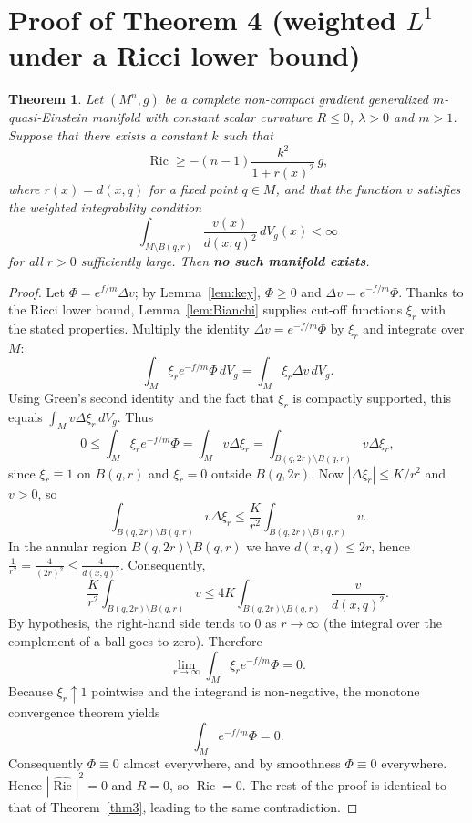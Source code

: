 \documentclass[12pt,a4paper]{article}
\newcommand{\Ric}{\operatorname{Ric}}
\newtheorem{theorem}{Theorem}[section]
\theoremstyle{definition}
\theoremstyle{definition}
\begin{document}
\section{Proof of Theorem 4 (weighted $L^1$ under a Ricci lower bound)}
\label{sec:thm4}

\begin{theorem}\label{thm4}
Let $(M^n,g)$ be a complete non-compact gradient generalized $m$-quasi-Einstein manifold with constant scalar curvature $R\le 0$, $\lambda>0$ and $m>1$.
Suppose that there exists a constant $k$ such that
\[
\Ric \ge -(n-1)\frac{k^2}{1+r(x)^2}\,g,
\]
where $r(x)=d(x,q)$ for a fixed point $q\in M$, and that the function $v$ satisfies the weighted integrability condition
\[
\int_{M\setminus B(q,r)} \frac{v(x)}{d(x,q)^2}\,dV_g(x) < \infty
\]
for all $r>0$ sufficiently large.
Then \textbf{no such manifold exists}.
\end{theorem}

\begin{proof}
Let $\Phi = e^{f/m}\Delta v$; by Lemma~\ref{lem:key}, $\Phi\ge 0$ and $\Delta v = e^{-f/m}\Phi$.
Thanks to the Ricci lower bound, Lemma~\ref{lem:Bianchi} supplies cut-off functions $\xi_r$ with the stated properties.
Multiply the identity $\Delta v = e^{-f/m}\Phi$ by $\xi_r$ and integrate over $M$:
\[
\int_M \xi_r e^{-f/m}\Phi \,dV_g = \int_M \xi_r \Delta v \,dV_g.
\]
Using Green's second identity and the fact that $\xi_r$ is compactly supported, this equals $\int_M v \Delta \xi_r \,dV_g$.
Thus
\[
0 \le \int_M \xi_r e^{-f/m}\Phi = \int_M v \Delta \xi_r
= \int_{B(q,2r)\setminus B(q,r)} v \Delta \xi_r,
\]
since $\xi_r\equiv 1$ on $B(q,r)$ and $\xi_r=0$ outside $B(q,2r)$.
Now $|\Delta \xi_r|\le K/r^2$ and $v>0$, so
\[
\int_{B(q,2r)\setminus B(q,r)} v \Delta \xi_r \le \frac{K}{r^2}\int_{B(q,2r)\setminus B(q,r)} v.
\]
In the annular region $B(q,2r)\setminus B(q,r)$ we have $d(x,q)\le 2r$, hence
$\frac{1}{r^2} = \frac{4}{(2r)^2} \le \frac{4}{d(x,q)^2}$.
Consequently,
\[
\frac{K}{r^2}\int_{B(q,2r)\setminus B(q,r)} v
\le 4K \int_{B(q,2r)\setminus B(q,r)} \frac{v}{d(x,q)^2}.
\]
By hypothesis, the right-hand side tends to $0$ as $r\to\infty$ (the integral over the complement of a ball goes to zero).
Therefore
\[
\lim_{r\to\infty}\int_M \xi_r e^{-f/m}\Phi = 0.
\]
Because $\xi_r\uparrow 1$ pointwise and the integrand is non-negative, the monotone convergence theorem yields
\[
\int_M e^{-f/m}\Phi = 0.
\]
Consequently $\Phi\equiv 0$ almost everywhere, and by smoothness $\Phi\equiv 0$ everywhere.
Hence $|\hat{\Ric}|^2=0$ and $R=0$, so $\Ric=0$.
The rest of the proof is identical to that of Theorem~\ref{thm3}, leading to the same contradiction.
\end{proof}
\end{document}
